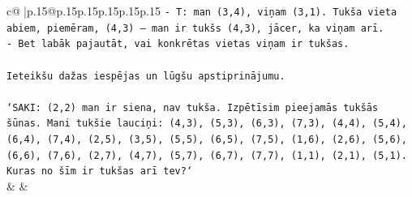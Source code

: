 \documentclass{article}
\begin{document}
{\begin{supertabular}{c@{$\;$}|p{.15\linewidth}@{}p{.15\linewidth}p{.15\linewidth}p{.15\linewidth}p{.15\linewidth}p{.15\linewidth}}
{{{\texttt{{-} T: man (3,4), viņam (3,1). Tukša vieta abiem, piemēram, (4,3) — man ir tukšs (4,3), jācer, ka viņam arī.} \\
\texttt{{-} Bet labāk pajautāt, vai konkrētas vietas viņam ir tukšas.} \\
\\ 
\texttt{Ieteikšu dažas iespējas un lūgšu apstiprinājumu.} \\
\\ 
\texttt{`SAKI: (2,2) man ir siena, nav tukša. Izpētīsim pieejamās tukšās šūnas. Mani tukšie lauciņi: (4,3), (5,3), (6,3), (7,3), (4,4), (5,4), (6,4), (7,4), (2,5), (3,5), (5,5), (6,5), (7,5), (1,6), (2,6), (5,6), (6,6), (7,6), (2,7), (4,7), (5,7), (6,7), (7,7), (1,1), (2,1), (5,1). Kuras no šīm ir tukšas arī tev?`} \\
            }
        }
    }
    & & \\ \\


\end{supertabular}}
\end{document}
